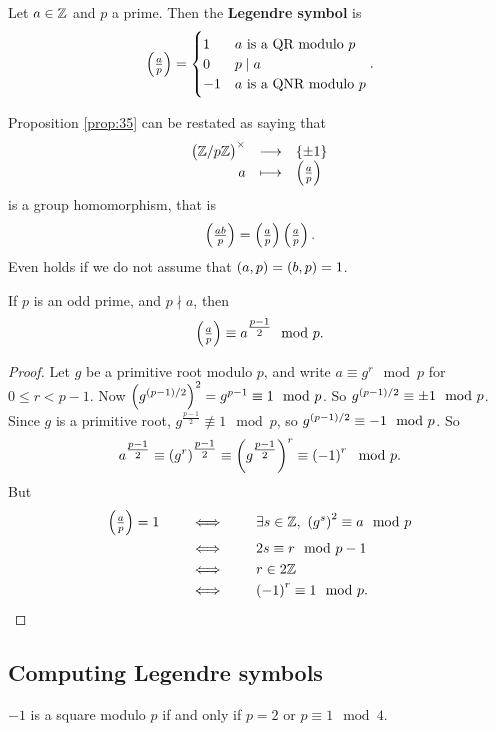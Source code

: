 \begin{definition}
Let $ a \in \mathbb{Z} $ and $ p $ a prime. Then the \textbf{Legendre symbol} is
$$ \symbol{a}{p} =
\begin{cases}
1 & a \ \text{is a QR modulo} \ p \\
0 & p \mid a \\
-1 & a \ \text{is a QNR modulo} \ p
\end{cases}.
$$
\end{definition}

Proposition \ref{prop:35} can be restated as saying that
$$ \function{\unit{p}}{\cbr{\pm 1}}{a}{\symbol{a}{p}} $$
is a group homomorphism, that is
$$ \symbol{ab}{p} = \symbol{a}{p}\symbol{a}{p}. $$
Even holds if we do not assume that $ \br{a, p} = \br{b, p} = 1 $.


\begin{theorem}
If $ p $ is an odd prime, and $ p \nmid a $, then
$$ \symbol{a}{p} \equiv a^{\tfrac{p - 1}{2}} \mod p. $$
\end{theorem}

\pagebreak

\begin{proof}
Let $ g $ be a primitive root modulo $ p $, and write $ a \equiv g^r \mod p $ for $ 0 \le r < p - 1 $. Now $ \br{g^{\br{p - 1} / 2}}^2 = g^{p - 1} \equiv 1 \mod p $. So $ g^{\br{p - 1} / 2} \equiv \pm 1 \mod p $. Since $ g $ is a primitive root, $ g^{\tfrac{p - 1}{2}} \not\equiv 1 \mod p $, so $ g^{\br{p - 1} / 2} \equiv -1 \mod p $. So
$$ a^{\tfrac{p - 1}{2}} \equiv \br{g^r}^{\tfrac{p - 1}{2}} \equiv \br{g^{\tfrac{p - 1}{2}}}^r \equiv \br{-1}^r \mod p. $$
But
\begin{align*}
\symbol{a}{p} = 1 \qquad
& \iff \qquad \exists s \in \ZZ, \ \br{g^s}^2 \equiv a \mod p \\
& \iff \qquad 2s \equiv r \mod p - 1 \\
& \iff \qquad r \in 2\ZZ \\
& \iff \qquad \br{-1}^r \equiv 1 \mod p.
\end{align*}
\end{proof}

\subsection{Computing Legendre symbols}

\begin{proposition}
$ -1 $ is a square modulo $ p $ if and only if $ p = 2 $ or $ p \equiv 1 \mod 4 $.
\end{proposition}

